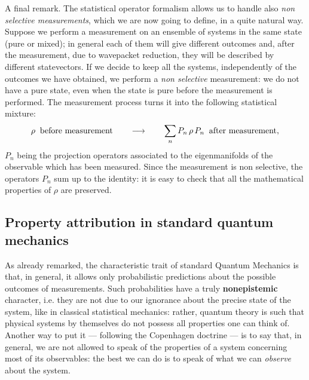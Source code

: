 \documentclass[10pt,a4paper]{article}
\begin{document}
A final remark. The statistical operator formalism allows us to
handle also {\it non selective measurements}, which we are now
going to define, in a quite natural way. Suppose we perform a
measurement on an ensemble of systems in the same state (pure or
mixed); in general each of them will give different outcomes and,
after the measurement, due to wavepacket reduction, they will be
described by different statevectors. If we decide to keep all the
systems, independently of the outcomes we have obtained, we
perform a {\it non selective} measurement: we do not have a pure
state, even when the state is pure before the measurement is
performed. The measurement process turns it into the following
statistical mixture:
\[
\rho \;\;\makebox{before measurement} \qquad \longrightarrow
\qquad \sum_{n} P_{n}\,\rho\,P_{n} \;\;\makebox{after
measurement},
\]
$P_{n}$ being the projection operators associated to the
eigenmanifolds of the observable which has been measured. Since
the measurement is non selective, the operators $P_{n}$ sum up to
the identity: it is easy to check that all the mathematical
properties of $\rho$ are preserved.


\subsection{Property attribution in standard quantum mechanics}
\label{sec14}

As already remarked, the characteristic trait of standard Quantum
Mechanics is that, in general, it allows only probabilistic
predictions about the possible outcomes of measurements. Such
probabilities have a truly {\bf nonepistemic} character, i.e. they
are not due to our ignorance about the precise state of the
system, like in classical statistical mechanics: rather, quantum
theory is such that physical systems by themselves do not possess
all properties one can think of. Another way to put it ---
following the Copenhagen doctrine --- is to say that, in general,
we are not allowed to speak of the properties of a system
concerning most of its observables: the best we can do is to speak
of what we can {\it observe} about the system.
\end{document}
